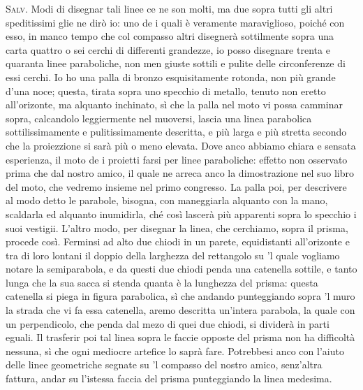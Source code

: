 \documentclass[11pt,twoside,openany]{book}
\newcommand{\speaker}[1]{\textcolor{rubric}{\textsc{#1}}\space}
\begin{document}
\speaker{Salv.} Modi di disegnar tali linee ce ne son molti, ma due sopra tutti gli altri speditissimi glie ne dirò io: uno de i quali è veramente maraviglioso, poiché con esso, in manco tempo che col compasso altri disegnerà sottilmente sopra una carta quattro o sei cerchi di differenti grandezze, io posso disegnare trenta e quaranta linee paraboliche, non men giuste sottili e pulite delle circonferenze di essi cerchi. Io ho una palla di bronzo esquisitamente rotonda, non più grande d'una noce; questa, tirata sopra uno specchio di metallo, tenuto non eretto all'orizonte, ma alquanto inchinato, sì che la palla nel moto vi possa camminar sopra, calcandolo leggiermente nel muoversi, lascia una linea parabolica sottilissimamente e pulitissimamente descritta, e più larga e più stretta secondo che la proiezzione si sarà più o meno elevata. Dove anco abbiamo chiara e sensata esperienza, il moto de i proietti farsi per linee paraboliche: effetto non osservato prima che dal nostro amico, il quale ne arreca anco la dimostrazione nel suo libro del moto, che vedremo insieme nel primo congresso. La palla poi, per descrivere al modo detto le parabole, bisogna, con maneggiarla alquanto con la mano, scaldarla ed alquanto inumidirla, ché così lascerà più apparenti sopra lo specchio i suoi vestigii. L'altro modo, per disegnar la linea, che cerchiamo, sopra il prisma, procede così. Ferminsi ad alto due chiodi in un parete, equidistanti all'orizonte e tra di loro lontani il doppio della larghezza del rettangolo su 'l quale vogliamo notare la semiparabola, e da questi due chiodi penda una catenella sottile, e tanto lunga che la sua sacca si stenda quanta è la lunghezza del prisma: questa catenella si piega in figura parabolica, sì che andando punteggiando sopra 'l muro la strada che vi fa essa catenella, aremo descritta un'intera parabola, la quale con un perpendicolo, che penda dal mezo di quei due chiodi, si dividerà in parti eguali. Il trasferir poi tal linea sopra le faccie opposte del prisma non ha difficoltà nessuna, sì che ogni mediocre artefice lo saprà fare. Potrebbesi anco con l'aiuto delle linee geometriche segnate su 'l compasso del nostro amico, senz'altra fattura, andar su l'istessa faccia del prisma punteggiando la linea medesima.
\end{document}
